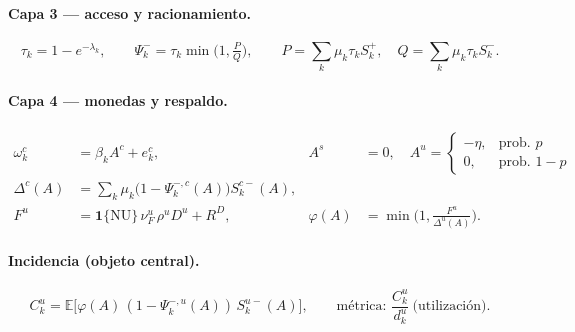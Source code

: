 \documentclass[11pt]{article}
\newcommand{\E}{\mathbb{E}}
\newcommand{\NU}{\mathrm{NU}}
\theoremstyle{definition}
\begin{document}
\paragraph{Capa 3 --- acceso y racionamiento.}
\begin{equation}
\tau_k=1-e^{-\lambda_k},\qquad
\Psi^-_k=\tau_k\min\!\Big(1,\tfrac{P}{Q}\Big),\qquad
P=\sum_k\mu_k\tau_k S^+_k,\quad Q=\sum_k\mu_k\tau_k S^-_k.
\label{eq:interbancario}
\end{equation}

\paragraph{Capa 4 --- monedas y respaldo.}
\begin{align}
\omega^c_k&=\beta_k A^c+e^c_k, &
A^s&=0,\quad
A^u=\begin{cases}-\eta,&\text{prob. }p\\ 0,&\text{prob. }1-p\end{cases}
\label{eq:monedas}\\
\Delta^c(A)&=\sum_k\mu_k\big(1-\Psi^{-,c}_k(A)\big)S^{c-}_k(A), \label{eq:delta}\\
F^u&=\mathbf{1}\{\NU\}\,\nu^u_F\,\rho^u D^u+R^D, &
\varphi(A)&=\min\!\Big(1,\tfrac{F^u}{\Delta^u(A)}\Big). \label{eq:phi}
\end{align}

\paragraph{Incidencia (objeto central).}
\begin{equation}
C^u_k=\E\big[\varphi(A)\,(1-\Psi^{-,u}_k(A))\,S^{u-}_k(A)\big],
\qquad\text{m\'etrica: } \frac{C^u_k}{d^u_k}\ \text{(utilizaci\'on).}
\label{eq:incidencia}
\end{equation}
\end{document}
